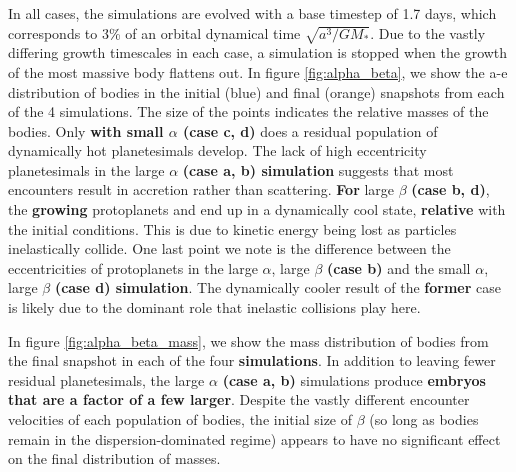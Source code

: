\documentclass[twocolumn,linenumbers]{aastex63}
\begin{document}
In all cases, the simulations are evolved with a base timestep of 1.7
days, which corresponds to 3\% of an orbital dynamical time
$\sqrt{a^3/G M_{*}}$. Due to the vastly differing growth timescales in
each case, a simulation is stopped when the growth of the most massive
body flattens out. In figure \ref{fig:alpha_beta}, we show the a-e
distribution of bodies in the initial (blue) and final (orange)
snapshots from each of the 4 simulations. The size of the points
indicates the relative masses of the bodies. Only \textbf{with small
$\alpha$ (case c, d)} does a residual population of dynamically hot planetesimals
develop. The lack of high eccentricity planetesimals in the large
$\alpha$ \textbf{(case a, b) simulation} suggests that most encounters result in accretion
rather than scattering. \textbf{For} large $\beta$ \textbf{(case b, d)}, the \textbf{growing} protoplanets
and end up in a dynamically cool state,
\textbf{relative} with the initial conditions. This is due to kinetic energy 
being lost as particles inelastically collide. One last point we note
is the difference between the eccentricities of protoplanets in the 
large $\alpha$, large $\beta$ \textbf{(case b)} and the small $\alpha$,
large $\beta$ \textbf{(case d) simulation}. The dynamically cooler result of the \textbf{former} case
is likely due to the dominant role that inelastic collisions play here.

In figure \ref{fig:alpha_beta_mass}, we show the mass distribution of bodies from the final snapshot in each of the four \textbf{simulations}. In addition to leaving fewer residual planetesimals, the large $\alpha$ \textbf{(case a, b)} simulations produce \textbf{embryos that are a factor of a few larger}. Despite the vastly different encounter velocities of each population of bodies, the initial size of $\beta$ (so long as bodies remain in the dispersion-dominated regime) appears to have no significant effect on the final distribution of masses.
\end{document}

